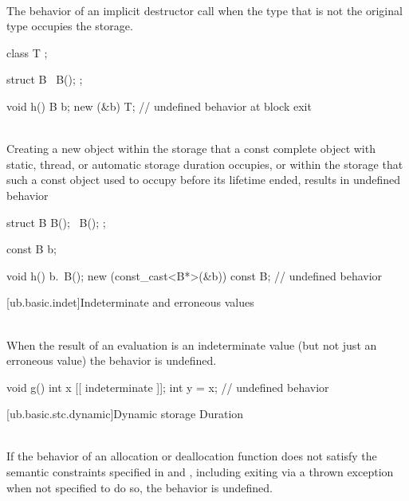 \pnum
{} \\
The behavior of an implicit destructor call when the type that is not
the original type occupies the storage.

\pnum
\begin{example}
\begin{codeblock}
class T {};

struct B {
  ~B();
};

void h() {
  B b;
  new (&b) T;
}               // undefined behavior at block exit
\end{codeblock}
\end{example}


\pnum
{} \\
Creating a new object within the storage that a const complete object with static, thread, or automatic
storage duration occupies, or within the storage that such a const object used to occupy before its lifetime
ended, results in undefined behavior

\pnum
\begin{example}
\begin{codeblock}
struct B {
  B();
  ~B();
};

const B b;

void h() {
  b.~B();
  new (const_cast<B*>(&b)) const B; // undefined behavior
}
\end{codeblock}
\end{example}

[ub.basic.indet]{Indeterminate and erroneous values}

\pnum
{} \\
When the result of an evaluation is
an indeterminate value
(but not just an erroneous value)
the behavior is undefined.

\pnum
\begin{example}
\begin{codeblock}
void g() {
  int x [[ indeterminate ]];
  int y = x;  // undefined behavior
}
\end{codeblock}
\end{example}

[ub.basic.stc.dynamic]{Dynamic storage Duration}

\pnum
{} \\
If the behavior of an allocation or deallocation function does not satisfy the semantic constraints
specified
in  and ,
including exiting via a thrown exception when not specified to do so,
the behavior is undefined.


